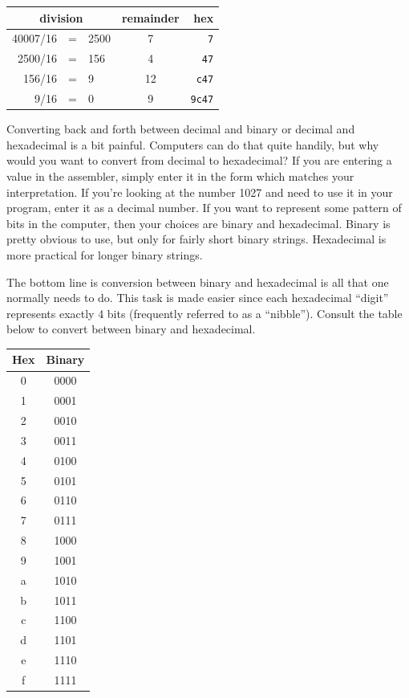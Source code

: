 \documentclass[11pt,b5paper]{book}
\begin{document}
\begin{center}
\begin{tabular}{rclcr}
\multicolumn{3}{c}{division} & remainder & hex \\
\hline
40007/16 &=& 2500 & 7 & {\tt 7} \\
2500/16  &=& 156  & 4 & {\tt 47} \\
156/16   &=& 9    & 12 & {\tt c47} \\
9/16     &=& 0    & 9  & {\tt 9c47} \\
\end{tabular}
\end{center}

Converting back and forth between decimal and binary or decimal and
hexadecimal is a bit painful.
Computers can do that quite handily, but why would you want to convert from
decimal to hexadecimal?
If you are entering a value in the assembler, simply enter it in the form
which matches your interpretation.
If you're looking at the number 1027 and need to use it in your program, enter
it as a decimal number.
If you want to represent some pattern of bits in the computer, then your
choices are binary and hexadecimal.
Binary is pretty obvious to use, but only for fairly short binary strings.
Hexadecimal is more practical for longer binary strings.

The bottom line is conversion between binary and hexadecimal is all that
one normally needs to do.
This task is made easier since each hexadecimal ``digit'' represents exactly 4
bits (frequently referred to as a ``nibble'').
Consult the table below to convert between binary and hexadecimal.
\begin{center}
\begin{tabular}{|c|c|}
\hline
Hex & Binary \\
\hline
0   & 0000 \\
\hline
1   & 0001 \\
\hline
2   & 0010 \\
\hline
3   & 0011 \\
\hline
4   & 0100 \\
\hline
5   & 0101 \\
\hline
6   & 0110 \\
\hline
7   & 0111 \\
\hline
8   & 1000 \\
\hline
9   & 1001 \\
\hline
a   & 1010 \\
\hline
b   & 1011 \\
\hline
c   & 1100 \\
\hline
d   & 1101 \\
\hline
e   & 1110 \\
\hline
f   & 1111 \\
\hline
\end{tabular}
\end{center}
\end{document}
